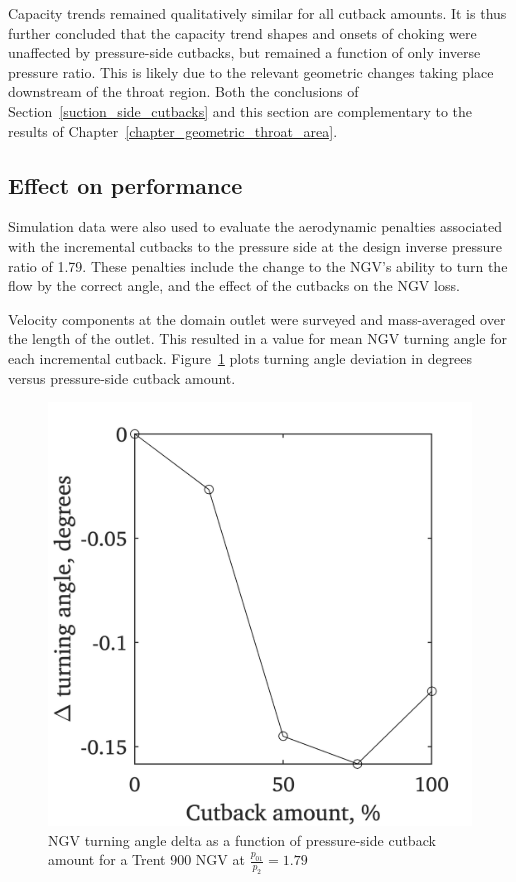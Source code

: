 \documentclass[a4paper, 11pt, oneside]{report}
\begin{document}
Capacity trends remained qualitatively similar for all cutback amounts. It is thus further concluded that the capacity trend shapes and onsets of choking were unaffected by pressure-side cutbacks, but remained a function of only inverse pressure ratio. This is likely due to the relevant geometric changes taking place downstream of the throat region. Both the conclusions of Section~\ref{suction_side_cutbacks} and this section are complementary to the results of Chapter~\ref{chapter_geometric_throat_area}.

\subsection{Effect on performance}




Simulation data were also used to evaluate the aerodynamic penalties associated with the incremental cutbacks to the pressure side at the design inverse pressure ratio of 1.79. These penalties include the change to the NGV's ability to turn the flow by the correct angle, and the effect of the cutbacks on the NGV loss.

Velocity components at the domain outlet were surveyed and mass-averaged over the length of the outlet. This resulted in a value for mean NGV turning angle for each incremental cutback. Figure~\ref{fig:ps_cutbacks_vs_turning_angles} plots turning angle deviation in degrees versus pressure-side cutback amount.

\begin{figure}[H]
	\centering
	\includegraphics[width=.45\textwidth]{figs/ps_cutbacks_vs_turning_angles.png}
	\caption{NGV turning angle delta as a function of pressure-side cutback amount for a Trent 900 NGV at $\frac{p_{01}}{p_2}=1.79$}
    \label{fig:ps_cutbacks_vs_turning_angles}
\end{figure}
\end{document}
